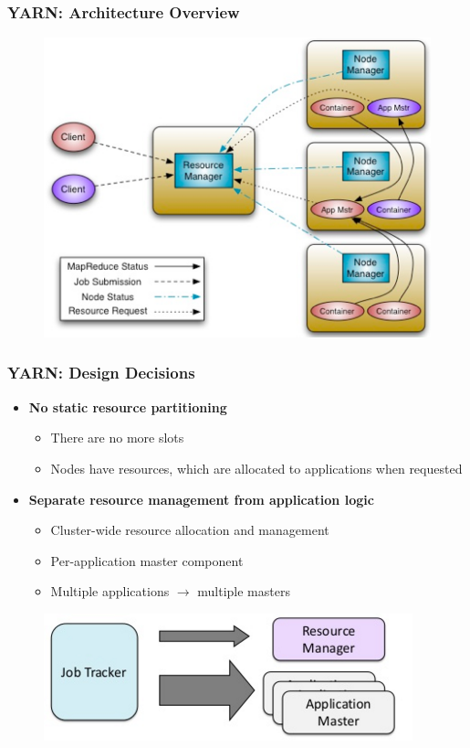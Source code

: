 \begin{frame}
\frametitle{YARN: Architecture Overview}
\begin{figure}[h]
  \centering
  \includegraphics[scale=0.5]{./figures/yarn_arch}
  \label{fig:yarn_arch}
\end{figure}
\end{frame}

\begin{frame}
\frametitle{YARN: Design Decisions}
\begin{itemize}
  \item {\bf No static resource partitioning}
  \begin{itemize}
    \item There are no more slots
    \item Nodes have resources, which are allocated to applications when requested
  \end{itemize}
  \item {\bf Separate resource management from application logic}
  \begin{itemize}
    \item Cluster-wide resource allocation and management
    \item Per-application master component
    \item Multiple applications $\to$ multiple masters
  \end{itemize}
\end{itemize}
\begin{figure}[h]
  \centering
  \includegraphics[scale=0.5]{./figures/yarn_key_idea}
  \label{fig:yarn_key_idea}
\end{figure}
\end{frame}

